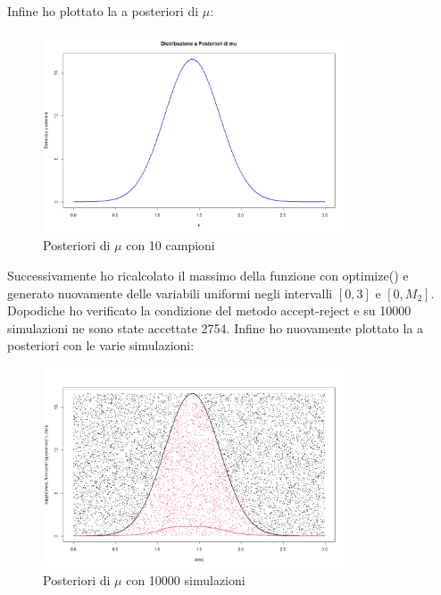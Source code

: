 \documentclass[a4paper,12pt]{article}
\begin{document}
\begin{itemize}
	Infine ho plottato la a posteriori di $\mu$:
	\begin{figure}[h] %
		\centering %
		\includegraphics[width=0.8\textwidth]{post.png} %
		\caption{Posteriori di $\mu$ con 10 campioni} %
		\label{fig:immagine} %
	\end{figure}
	\newpage
	Successivamente ho ricalcolato il massimo della funzione con optimize() e generato nuovamente delle variabili uniformi negli intervalli $[0,3]$ e $[0,M_2]$. Dopodiche ho verificato la condizione del metodo accept-reject e su 10000 simulazioni ne sono state accettate 2754. Infine ho nuovamente plottato la a posteriori con le varie simulazioni:
	\begin{figure}[h] %
		\centering %
		\includegraphics[width=0.8\textwidth]{post2.png} %
		\caption{Posteriori di $\mu$ con 10000 simulazioni} %
		\label{fig:immagine} %

\end{figure}
\end{itemize}
\end{document}
